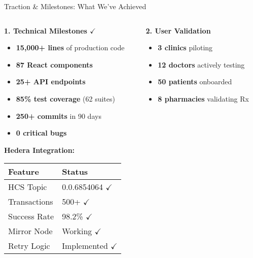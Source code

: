 \documentclass[aspectratio=169,xcolor=dvipsnames,20pt]{beamer}
\newcommand{\checkitem}{\item[\color{SuccessGreen}\faCheckCircle]}
\begin{document}
\begin{frame}{Traction \& Milestones: What We've Achieved}

  \begin{columns}[T]
    \begin{column}{0.5\textwidth}
      \textbf{\textcolor{SuccessGreen}{1. Technical Milestones $\checkmark$}}

      \begin{itemize}
        \checkitem \textbf{15,000+ lines} of production code
        \checkitem \textbf{87 React components}
        \checkitem \textbf{25+ API endpoints}
        \checkitem \textbf{85\% test coverage} (62 suites)
        \checkitem \textbf{250+ commits} in 90 days
        \checkitem \textbf{0 critical bugs}
      \end{itemize}

      \vspace{0.3cm}

      \textbf{Hedera Integration:}
      \begin{table}
        \scriptsize
        \begin{tabular}{ll}
          \toprule
          \textbf{Feature} & \textbf{Status} \\
          \midrule
          HCS Topic & \textcolor{SuccessGreen}{0.0.6854064 $\checkmark$} \\
          Transactions & \textcolor{SuccessGreen}{500+ $\checkmark$} \\
          Success Rate & \textcolor{SuccessGreen}{98.2\% $\checkmark$} \\
          Mirror Node & \textcolor{SuccessGreen}{Working $\checkmark$} \\
          Retry Logic & \textcolor{SuccessGreen}{Implemented $\checkmark$} \\
          \bottomrule
        \end{tabular}
      \end{table}
    \end{column}

    \begin{column}{0.5\textwidth}
      \textbf{\textcolor{SuccessGreen}{2. User Validation}}

      \begin{itemize}
        \checkitem \textbf{3 clinics} piloting
        \checkitem \textbf{12 doctors} actively testing
        \checkitem \textbf{50 patients} onboarded
        \checkitem \textbf{8 pharmacies} validating Rx
      \end{itemize}


\end{column}
\end{columns}
\end{frame}
\end{document}
